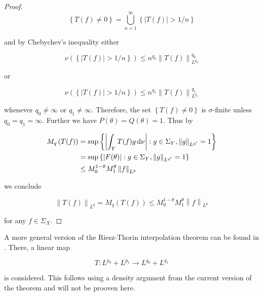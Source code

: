 \begin{proof}
\begin{equation*}
	\left\{ T(f) \neq 0\right\} = \bigcup_{n = 1}^\infty \left\{ \left| T(f)\right| > 1/n\right\}
\end{equation*}

\noindent and by Chebychev's inequality either

\begin{equation*}
	\nu\left( \left\{ \left| T(f)\right| > 1/n\right\} \right) \leq n^{q_0}\left\| T(f)\right\|_{L^{q_0}}^{q_0}
\end{equation*}

\noindent or

\begin{equation*}
	\nu\left( \left\{ \left| T(f)\right| > 1/n\right\} \right) \leq n^{q_1}\left\| T(f)\right\|_{L^{q_1}}^{q_1}
\end{equation*}

\noindent whenever $q_0 \neq \infty$ or $q_1 \neq \infty$. Therefore, the set $\left\{ T(f) \neq 0\right\}$ is $\sigma$-finite unless $q_0 = q_1 = \infty$. Further we have $P(\theta) = Q(\theta) = 1$. Thus by

\begin{gather*}
	\begin{aligned}
		M_q\left( T(f) \right) &= \sup\left\{\left| \int_Y T(f)g\mathop{}\!\mathrm{d}\nu\right| : g \in \Sigma_Y, \left\|g\right\|_{L^{q'}} = 1\right\}\\
		&=  \sup\left\{\left| F(\theta)\right| : g \in \Sigma_Y, \left\|g\right\|_{L^{q'}} = 1\right\}\\
		&\leq M_0^{1 - \theta}M_1^\theta \left\|f\right\|_{L^p}\\
	\end{aligned}
\end{gather*}

\noindent we conclude 
	
\begin{equation*}
	\left\| T(f)\right\|_{L^q} = M_q\left( T(f) \right) \leq M_0^{1 - \theta}M_1^\theta \left\|f\right\|_{L^p}
\end{equation*}
	
\noindent for any $f \in \Sigma_X$.
\end{proof}

\begin{remark*}
	A more general version of the Riesz-Thorin interpolation theorem can be found in \textup{\cite[200--202]{folland:real_analysis:1999}}. There, a linear map 

	\begin{equation*}
		T: L^{p_0} + L^{p_1} \rightarrow L^{q_0} + L^{q_1}
	\end{equation*}

	\noindent is considered. This follows using a density argument from the current version of the theorem and will not be prooven here.
	\label{rem:extension}
\end{remark*}

